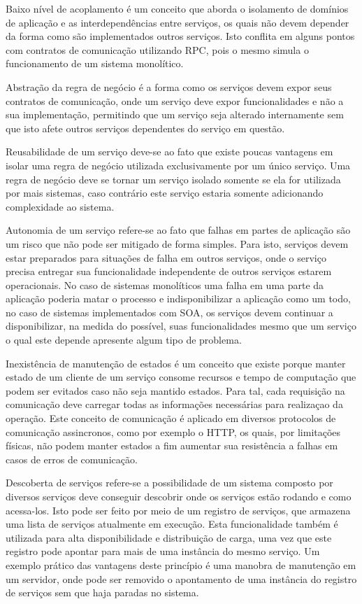 Baixo nível de acoplamento é um conceito que aborda o isolamento de domínios
de aplicação e as interdependências entre serviços, os quais não devem
depender da forma como são implementados outros serviços. Isto conflita
em alguns pontos com contratos de comunicação utilizando \ac{RPC}, pois o
mesmo simula o funcionamento de um sistema monolítico.

Abstração da regra de negócio é a forma como os serviços devem expor
seus contratos de comunicação, onde um serviço deve expor funcionalidades
e não a sua implementação, permitindo que um serviço seja alterado internamente
sem que isto afete outros serviços dependentes do serviço em questão.

Reusabilidade de um serviço deve-se ao fato que existe poucas vantagens em
isolar uma regra de negócio utilizada exclusivamente por um único serviço. Uma
regra de negócio deve se tornar um serviço isolado somente se ela for utilizada
por mais sistemas, caso contrário este serviço estaria somente adicionando
complexidade ao sistema.

Autonomia de um serviço refere-se ao fato que falhas em partes de aplicação
são um risco que não pode ser mitigado de forma simples. Para isto, serviços
devem estar preparados para situações de falha em outros serviços, onde
o serviço precisa entregar sua funcionalidade independente de outros serviços
estarem operacionais. No caso de sistemas monolíticos uma falha
em uma parte da aplicação poderia matar o processo e indisponibilizar
a aplicação como um todo, no caso de sistemas implementados com \ac{SOA}, os
serviços devem continuar a disponibilizar, na medida do possível, suas
funcionalidades mesmo que um serviço o qual este depende apresente algum tipo
de problema.

Inexistência de manutenção de estados é um conceito que existe porque
manter estado de um cliente de um serviço consome recursos e tempo de
computação que podem ser evitados caso não seja mantido estados. Para tal,
cada requisição na comunicação deve carregar todas as informações necessárias
para realizaçao da operação. Este conceito de comunicação é aplicado em diversos
protocolos de comunicação assincronos, como por exemplo o \ac{HTTP}, os quais,
por limitações físicas, não podem manter estados a fim aumentar sua
resistência a falhas em casos de erros de comunicação.

Descoberta de serviços refere-se a possibilidade de um sistema composto
por diversos serviços deve conseguir descobrir onde os serviços estão
rodando e como acessa-los. Isto pode ser feito por meio de um
registro de serviços, que armazena uma lista de serviços atualmente em execução.
Esta funcionalidade também é utilizada para alta disponibilidade e distribuição
de carga, uma vez que este registro pode apontar para mais de uma instância do
mesmo serviço. Um exemplo prático das vantagens deste princípio é uma manobra
de manutenção em um servidor, onde pode ser removido o apontamento de uma
instância do registro de serviços sem que haja paradas no sistema.

